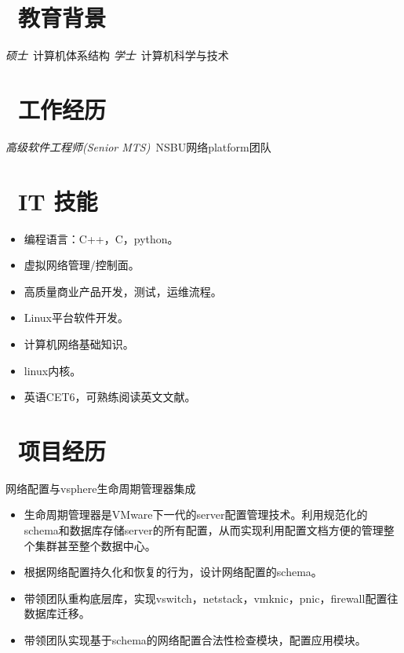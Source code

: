 \documentclass{resume}
\begin{document}


 
\section{\faGraduationCap\  教育背景}
\textit{硕士}\ 计算机体系结构
\textit{学士}\ 计算机科学与技术

\section{\faWrench\  工作经历}
\textit{高级软件工程师(Senior MTS)}\  NSBU网络platform团队

\section{\faCogs\ IT 技能}
\begin{itemize}[parsep=0.5ex]
  \item 编程语言：C++，C，python。
  \item 虚拟网络管理/控制面。
  \item 高质量商业产品开发，测试，运维流程。
  \item Linux平台软件开发。
  \item 计算机网络基础知识。
  \item linux内核。
  \item 英语CET6，可熟练阅读英文文献。
\end{itemize}

\section{\faUsers\ 项目经历}
网络配置与vsphere生命周期管理器集成
\begin{itemize}
  \item 生命周期管理器是VMware下一代的server配置管理技术。利用规范化的schema和数据库存储server的所有配置，从而实现利用配置文档方便的管理整个集群甚至整个数据中心。
  \item 根据网络配置持久化和恢复的行为，设计网络配置的schema。
  \item 带领团队重构底层库，实现vswitch，netstack，vmknic，pnic，firewall配置往数据库迁移。
  \item 带领团队实现基于schema的网络配置合法性检查模块，配置应用模块。
\end{itemize}
\end{document}
